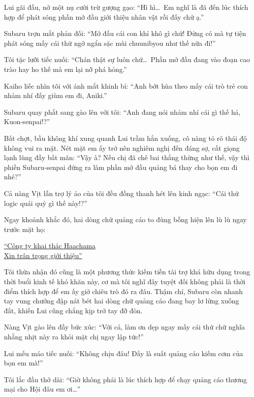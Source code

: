 \documentclass[../main.tex]{subfiles}
\begin{document}
Lui gãi đầu, nở một nụ cười trừ gượng gạo: ``Hì hì\dots\ Em nghĩ là đã đến lúc thích hợp để phát sóng phần mở đầu giới thiệu nhân vật rồi đấy chứ ạ.''

Subaru trợn mắt phản đối: ``Mở đầu cái con khỉ khô gì chứ! Đừng có mà tự tiện phát sóng mấy cái thứ ngớ ngẩn sặc mùi chuunibyou như thế nữa đi!''

Tôi tặc lưỡi tiếc nuối: ``Chán thật sự luôn chứ\dots\ Phần mở đầu đang vào đoạn cao trào hay ho thế mà em lại nỡ phá hỏng.''

Kaiho liếc nhìn tôi với ánh mắt khinh bỉ: ``Anh bớt hùa theo mấy cái trò trẻ con nhảm nhí đấy giùm em đi, Aniki.''

Subaru quay phắt sang gào lên với tôi: ``Anh đang nói nhảm nhí cái gì thế hả, Kuon-senpai!?''

Bất chợt, bầu không khí xung quanh Lui trầm hẳn xuống, cô nàng tỏ rõ thái độ không vui ra mặt. Nét mặt em ấy trở nên nghiêm nghị đến đáng sợ, cất giọng lạnh lùng đầy bất mãn: ``Vậy à? Nếu chị đã chê bai thẳng thừng như thế, vậy thì phiền Subaru-senpai đứng ra làm phần mở đầu quảng bá thay cho bọn em đi nhé?''

Cả nàng Vịt lẫn trợ lý ảo của tôi đều đồng thanh hét lên kinh ngạc: ``Cái thứ logic quái quỷ gì thế này!?''

Ngay khoảnh khắc đó, hai dòng chữ quảng cáo to đùng bỗng hiện lên lù lù ngay trước mặt họ:

\begin{center}
    \uline{``Công ty khai thác Haachama\\
        Xin trân trọng giới thiệu''}
\end{center}


Tôi thừa nhận đó cũng là một phương thức kiếm tiền tài trợ khá hữu dụng trong thời buổi kinh tế khó khăn này, cơ mà tôi nghĩ đây tuyệt đối không phải là thời điểm thích hợp để em ấy giở chiêu trò đó ra đâu. Thậm chí, Subaru còn nhanh tay vung chưởng đập nát bét hai dòng chữ quảng cáo đang bay lơ lửng xuống đất, khiến Lui cũng chẳng kịp trở tay đỡ đòn.

Nàng Vịt gào lên đầy bức xúc: ``Với cả, làm ơn dẹp ngay mấy cái thứ chữ nghĩa nhằng nhịt này ra khỏi mặt chị ngay lập tức!''

Lui mếu máo tiếc nuối: ``Không chịu đâu! Đấy là suất quảng cáo kiếm cơm của bọn em mà!''

Tôi lắc đầu thở dài: ``Giờ không phải là lúc thích hợp để chạy quảng cáo thương mại cho Hội đâu em ơi\dots''
\end{document}
